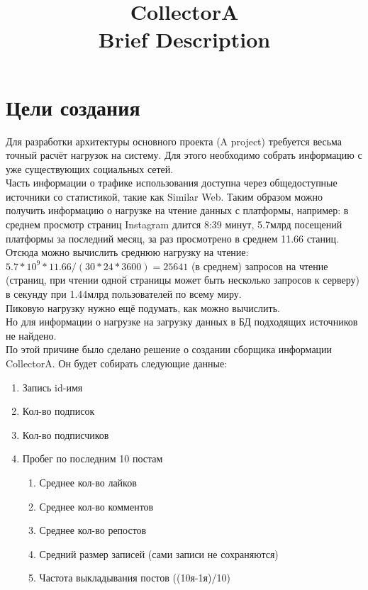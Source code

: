 \documentclass[12pt]{article}
\title{CollectorA \\ Brief Description}
\begin{document}
\maketitle

\section*{Цели создания}
Для разработки архитектуры основного проекта (A project) требуется весьма точный расчёт нагрузок на систему. 
Для этого необходимо собрать информацию с уже существующих социальных сетей. \\

Часть информации о трафике использования доступна через общедоступные источники со статистикой, такие как Similar Web. 
Таким образом можно получить информацию о нагрузке на чтение данных с платформы, например: в среднем просмотр страниц Instagram длится 8:39 минут, 
5.7млрд посещений платформы за последний месяц, за раз просмотрено в среднем 11.66 станиц. Отсюда можно вычислить среднюю нагрузку на чтение: 
$5.7 * 10^9 * 11.66 / (30 * 24 * 3600) = 25641$ (в среднем) запросов на чтение (страниц, 
при чтении одной страницы может быть несколько запросов к серверу) в секунду при 1.44млрд пользователей по всему миру.\\

Пиковую нагрузку нужно ещё подумать, как можно вычислить.\\

Но для информации о нагрузке на загрузку данных в БД подходящих источников не найдено.\\

По этой причине было сделано решение о создании сборщика информации CollectorA. Он будет собирать следующие данные:
\begin{enumerate}
    \item Запись id-имя
    \item Кол-во подписок
    \item Кол-во подписчиков
    \item Пробег по последним 10 постам
        \begin {enumerate}
            \item Среднее кол-во лайков
            \item Среднее кол-во комментов
            \item Среднее кол-во репостов
            \item Средний размер записей (сами записи не сохраняются)
            \item Частота выкладывания постов ((10я-1я)/10)
        \end{enumerate}
\end{enumerate}
\end{document}
